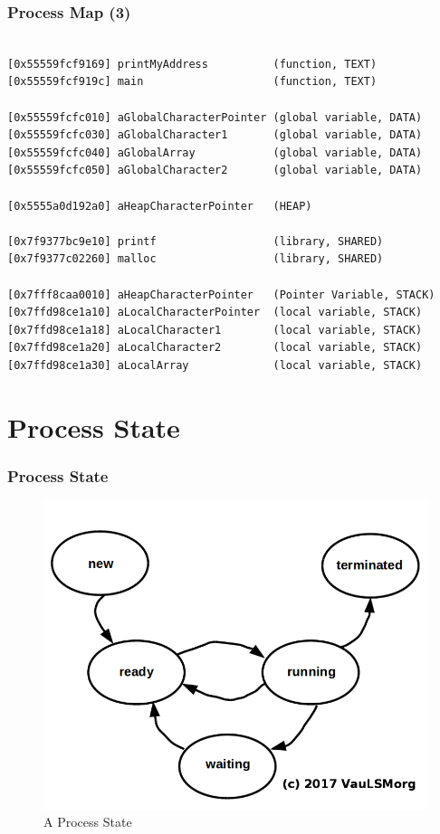 \documentclass[aspectratio=169, xcolor=table, notheorems, hyperref={pdfpagelabels=false}]{beamer}
\begin{document}
\begin{frame}[fragile]
\frametitle{Process Map (3)}
\begin{lstlisting}[basicstyle=\ttfamily\footnotesize] %  72

[0x55559fcf9169] printMyAddress          (function, TEXT)
[0x55559fcf919c] main                    (function, TEXT)

[0x55559fcfc010] aGlobalCharacterPointer (global variable, DATA)
[0x55559fcfc030] aGlobalCharacter1       (global variable, DATA)
[0x55559fcfc040] aGlobalArray            (global variable, DATA)
[0x55559fcfc050] aGlobalCharacter2       (global variable, DATA)

[0x5555a0d192a0] aHeapCharacterPointer   (HEAP)

[0x7f9377bc9e10] printf                  (library, SHARED)
[0x7f9377c02260] malloc                  (library, SHARED)

[0x7fff8caa0010] aHeapCharacterPointer   (Pointer Variable, STACK)
[0x7ffd98ce1a10] aLocalCharacterPointer  (local variable, STACK)
[0x7ffd98ce1a18] aLocalCharacter1        (local variable, STACK)
[0x7ffd98ce1a20] aLocalCharacter2        (local variable, STACK)
[0x7ffd98ce1a30] aLocalArray             (local variable, STACK)

\end{lstlisting}
\end{frame}

\section{Process State}
\begin{frame}[fragile]
\frametitle{Process State}
\begin{figure}
\includegraphics[width=0.55\linewidth]{os06-state}
\caption{A Process State}
\end{figure}
\end{frame}
\end{document}
